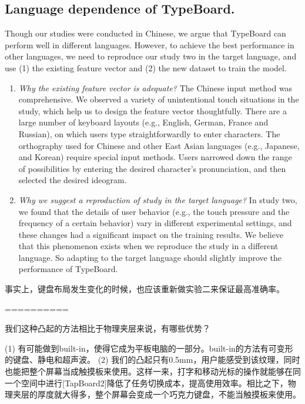 
\subsection{Language dependence of TypeBoard.}

Though our studies were conducted in Chinese, we argue that TypeBoard can perform well in different languages. However, to achieve the best performance in other languages, we need to reproduce our study two in the target language, and use (1) the existing feature vector and (2) the new dataset to train the model.

\begin{enumerate}
	\item{\emph{Why the existing feature vector is adequate?} The Chinese input method was comprehensive. We observed a variety of unintentional touch situations in the study, which help us to design the feature vector thoughtfully. There are a large number of keyboard layouts (e.g., English, German, France and Russian), on which users type straightforwardly to enter characters. The orthography used for Chinese and other East Asian languages (e.g., Japanese, and Korean) require special input methods. Users narrowed down the range of possibilities by entering the desired character's pronunciation, and then selected the desired ideogram.}
	\item{\emph{Why we suggest a reproduction of study in the target language?} In study two, we found that the details of user behavior (e.g., the touch pressure and the frequency of a certain behavior) vary in different experimental settings, and these changes had a significant impact on the training results. We believe that this phenomenon exists when we reproduce the study in a different language. So adapting to the target language should slightly improve the performance of TypeBoard.}
\end{enumerate}

事实上，键盘布局发生变化的时候，也应该重新做实验二来保证最高准确率。

==========

我们这种凸起的方法相比于物理夹层来说，有哪些优势？

(1) 有可能做到built-in，使得它成为平板电脑的一部分。built-in的方法有可变形的键盘、静电和超声波。
(2) 我们的凸起只有0.5mm，用户能感受到该纹理，同时也能把整个屏幕当成触摸板来使用。这样一来，打字和移动光标的操作就能够在同一个空间中进行[TapBoard2]降低了任务切换成本，提高使用效率。相比之下，物理夹层的厚度就大得多，整个屏幕会变成一个巧克力键盘，不能当触摸板来使用。

